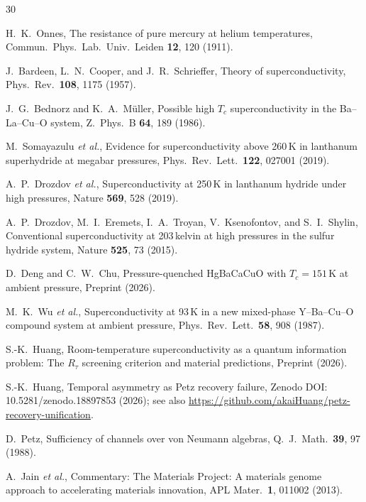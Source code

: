 \documentclass[prl,twocolumn,superscriptaddress,longbibliography,floatfix]{revtex4-2}
\begin{document}
\begin{thebibliography}{30}

H.~K.~Onnes,
The resistance of pure mercury at helium temperatures,
Commun.\ Phys.\ Lab.\ Univ.\ Leiden \textbf{12}, 120 (1911).

J.~Bardeen, L.~N.~Cooper, and J.~R.~Schrieffer,
Theory of superconductivity,
Phys.\ Rev.\ \textbf{108}, 1175 (1957).

J.~G.~Bednorz and K.~A.~M\"uller,
Possible high $T_c$ superconductivity in the Ba--La--Cu--O system,
Z.\ Phys.\ B \textbf{64}, 189 (1986).

M.~Somayazulu \textit{et al.},
Evidence for superconductivity above 260\,K in lanthanum superhydride at megabar pressures,
Phys.\ Rev.\ Lett.\ \textbf{122}, 027001 (2019).

A.~P.~Drozdov \textit{et al.},
Superconductivity at 250\,K in lanthanum hydride under high pressures,
Nature \textbf{569}, 528 (2019).

A.~P.~Drozdov, M.~I.~Eremets, I.~A.~Troyan, V.~Ksenofontov, and S.~I.~Shylin,
Conventional superconductivity at 203\,kelvin at high pressures in the sulfur hydride system,
Nature \textbf{525}, 73 (2015).

D.~Deng and C.~W.~Chu,
Pressure-quenched HgBaCaCuO with $T_c = 151\,$K at ambient pressure,
Preprint (2026).

M.~K.~Wu \textit{et al.},
Superconductivity at 93\,K in a new mixed-phase Y--Ba--Cu--O compound system at ambient pressure,
Phys.\ Rev.\ Lett.\ \textbf{58}, 908 (1987).

S.-K.~Huang,
Room-temperature superconductivity as a quantum information problem:
The $R_\tau$ screening criterion and material predictions,
Preprint (2026).

S.-K.~Huang,
Temporal asymmetry as Petz recovery failure,
Zenodo DOI: 10.5281/zenodo.18897853 (2026);
see also \url{https://github.com/akaiHuang/petz-recovery-unification}.

D.~Petz,
Sufficiency of channels over von Neumann algebras,
Q.\ J.\ Math.\ \textbf{39}, 97 (1988).

A.~Jain \textit{et al.},
Commentary: The Materials Project: A materials genome approach to accelerating materials innovation,
APL Mater.\ \textbf{1}, 011002 (2013).


\end{thebibliography}
\end{document}
